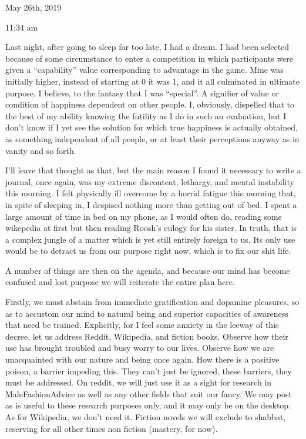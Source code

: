 \bigskip
\bigskip
May 26th, 2019

11:34 am

Last night, after going to sleep far too late, I had a dream. I had been
selected because of some circumstance to enter a competition in which
participants were given a ``capability'' value corresponding to
advantage in the game. Mine was initially higher, instead of starting at
0 it was 1, and it all culminated in ultimate purpose, I believe, to the
fantasy that I was ``special''. A signifier of value or condition of
happiness dependent on other people. I, obviously, dispelled that to the
best of my ability knowing the futility as I do in such an evaluation,
but I don't know if I yet see the solution for which true happiness is
actually obtained, as something independent of all people, or at least
their perceptions anyway as in vanity and so forth.

\qquad I'll leave that thought as that, but the main reason I found it
necessary to write a journal, once again, was my extreme discontent,
lethargy, and mental instability this morning. I felt physically ill
overcome by a horrid fatigue this morning that, in spite of sleeping in,
I despised nothing more than getting out of bed. I spent a large amount
of time in bed on my phone, as I would often do, reading some wikepedia
at first but then reading Roosh's eulogy for his sister. In truth, that
is a complex jungle of a matter which is yet still entirely foreign to
us. Its only use would be to detract us from our purpose right now,
which is to fix our shit life.

\qquad A number of things are then on the agenda, and because our mind
has become confused and lost purpose we will reiterate the entire plan
here.

Firstly, we must abstain from immediate gratification and dopamine
pleasures, so as to accustom our mind to natural being and superior
capacities of awareness that need be trained. Explicitly, for I feel
some anxiety in the leeway of this decree, let us address Reddit,
Wikipedia, and fiction books. Observe how their use has brought troubled
and busy worry to our lives. Observe how we are unacquainted with our
nature and being once again. How there is a positive poison, a barrier
impeding this. They can't just be ignored, these barriers, they must be
addressed. On reddit, we will just use it as a sight for research in
MaleFashionAdvice as well as any other fields that suit our fancy. We
may post as is useful to these research purposes only, and it may only
be on the desktop. As for Wikipedia, we don't need it. Fiction novels we
will exclude to shabbat, reserving for all other times non fiction
(mastery, for now).

